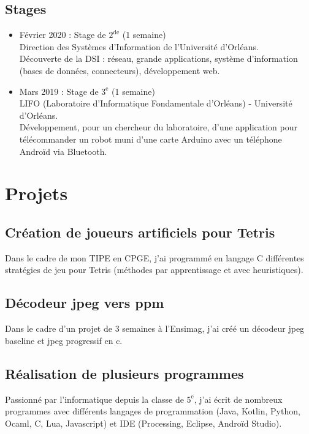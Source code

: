 \documentclass[11pt,oneside,a4paper,titlepage]{article}
\begin{document}
\begin{tcolorbox}
\begin{minipage}[t]{10.6cm}
\begin{tcolorbox}[grow to right by=0.75cm,colframe=white,colback=white]
      \section*{Stages}
      \begin{itemize}
        \item{Février 2020 : Stage de $2^{\text{de}}$ (1 semaine)\\Direction des Systèmes d'Information de l'Université d'Orléans.\\Découverte de la DSI : réseau, grande applications, système d'information (bases de données, connecteurs), développement web.}
        \item{Mars 2019 : Stage de $3^{\text{e}}$ (1 semaine)\\LIFO (Laboratoire d'Informatique Fondamentale d'Orléans) - Université d'Orléans.\\Développement, pour un chercheur du laboratoire, d'une application pour télécommander un robot muni d'une carte Arduino avec un téléphone Androïd via Bluetooth.}
      \end{itemize}
    \end{tcolorbox}
  \end{minipage}
\end{tcolorbox}

\vspace*{-1cm}
\section*{Projets}
\subsection*{Création de joueurs artificiels pour Tetris}
Dans le cadre de mon TIPE en CPGE, j'ai programmé en langage C différentes stratégies de jeu pour Tetris (méthodes par apprentissage et avec heuristiques).
\subsection*{Décodeur jpeg vers ppm}
Dans le cadre d'un projet de 3 semaines à l'Ensimag, j'ai créé un décodeur jpeg baseline et jpeg progressif en c.
\subsection*{Réalisation de plusieurs programmes}
Passionné par l'informatique depuis la classe de $5^{\text{e}}$, j'ai écrit de nombreux programmes avec différents langages de programmation (Java, Kotlin, Python, Ocaml, C, Lua, Javascript) et IDE (Processing, Eclipse, Androïd Studio).
\end{document}
